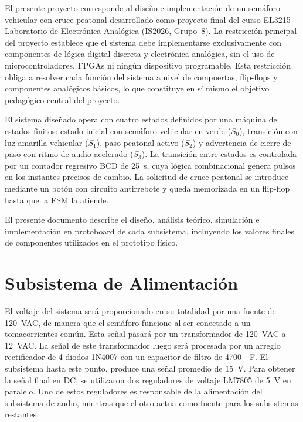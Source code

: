 \documentclass[12pt,onecolumn]{IEEEtran}
\begin{document}
El presente proyecto corresponde al diseño e implementación de un semáforo vehicular con cruce peatonal desarrollado como proyecto final del curso EL3215 Laboratorio de Electrónica Analógica (IS2026, Grupo~8). La restricción principal del proyecto establece que el sistema debe implementarse exclusivamente con componentes de lógica digital discreta y electrónica analógica, sin el uso de microcontroladores, FPGAs ni ningún dispositivo programable. Esta restricción obliga a resolver cada función del sistema a nivel de compuertas, flip-flops y componentes analógicos básicos, lo que constituye en sí mismo el objetivo pedagógico central del proyecto.

El sistema diseñado opera con cuatro estados definidos por una máquina de estados finitos: estado inicial con semáforo vehicular en verde ($S_0$), transición con luz amarilla vehicular ($S_1$), paso peatonal activo ($S_2$) y advertencia de cierre de paso con ritmo de audio acelerado ($S_3$). La transición entre estados es controlada por un contador regresivo BCD de 25~s, cuya lógica combinacional genera pulsos en los instantes precisos de cambio. La solicitud de cruce peatonal se introduce mediante un botón con circuito antirrebote y queda memorizada en un flip-flop hasta que la FSM la atiende.

El presente documento describe el diseño, análisis teórico, simulación e implementación en protoboard de cada subsistema, incluyendo los valores finales de componentes utilizados en el prototipo físico.


\section{Subsistema de Alimentación}

El voltaje del sistema será proporcionado en su totalidad por una fuente de \qty{120}{VAC}, de manera que el semáforo funcione al ser conectado a un tomacorrientes común. Esta señal pasará por un transformador de \qty{120}{VAC} a \qty{12}{VAC}. La señal de este transformador luego será procesada por un arreglo rectificador de 4 diodos 1N4007 con un capacitor de filtro de \qty{4700}{\mu F}. El subsistema hasta este punto, produce una señal promedio de \qty{15}{V}. Para obtener la señal final en DC, se utilizaron dos reguladores de voltaje LM7805 de \qty{5}{V} en paralelo. Uno de estos reguladores es responsable de la alimentación del subsistema de audio, mientras que el otro actua como fuente para los subsistemas restantes.
\end{document}
